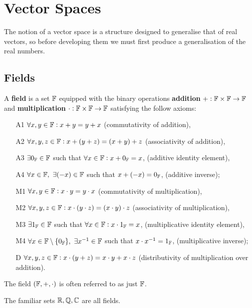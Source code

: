 \documentclass[../Year1/Year1.tex]{subfiles}
\begin{document}
\section{Vector Spaces}
The notion of a vector space is a structure designed to generalise that of real vectors, so before developing them we must first produce a generalisation of the real numbers.
\subsection{Fields}
\begin{definition}[Field]
    A \textbf{field} is a set $\mathbb{F}$ equipped with the binary operations \textbf{addition} $+:\mathbb{F}\times\mathbb{F}\rightarrow\mathbb{F}$ and \textbf{multiplication} $\cdot:\mathbb{F}\times\mathbb{F}\rightarrow\mathbb{F}$ satisfying the follow axioms:
    \begin{enumerate}
        \item[A1] $\forall x,y \in \mathbb{F}: x+y=y+x$ (commutativity of addition),
        \item[A2] $\forall x,y,z \in \mathbb{F}: x+(y+z)=(x+y)+z$ (associativity of addition),
        \item[A3] $\exists 0_{\mathbb{F}} \in \mathbb{F}$ such that $\forall x\in\mathbb{F}: x + 0_{\mathbb{F}} = x$, (additive identity element),
        \item[A4] $\forall x\in\mathbb{F}, \ \exists (-x)\in\mathbb{F}$ such that $x+(-x)=0_{\mathbb{F}}$, (additive inverse);
        
        \item[M1] $\forall x,y \in \mathbb{F}: x\cdot y=y\cdot x$ (commutativity of multiplication),
        \item[M2] $\forall x,y,z \in \mathbb{F}: x\cdot (y\cdot z)=(x\cdot y)\cdot z$ (associativity of multiplication),
        \item[M3] $\exists 1_{\mathbb{F}} \in \mathbb{F}$ such that $\forall x\in\mathbb{F}: x \cdot  1_{\mathbb{F}} = x$, (multiplicative identity element),
        \item[M4] $\forall x\in\mathbb{F}\setminus\{0_{\mathbb{F}}\}, \ \exists x^{-1}\in\mathbb{F}$ such that $x\cdot x^{-1}=1_{\mathbb{F}}$, (multiplicative inverse);

        \item[D] $\forall x,y,z \in \mathbb{F}: x\cdot(y+z)=x\cdot y+x\cdot z$ (distributivity of multiplication over addition).
    \end{enumerate}
    The field $(\mathbb{F},+,\cdot)$ is often referred to as just $\mathbb{F}$.
\end{definition}

\begin{example}
    The familiar sets $\mathbb{R}, \mathbb{Q}, \mathbb{C}$ are all fields.
\end{example}
\end{document}
